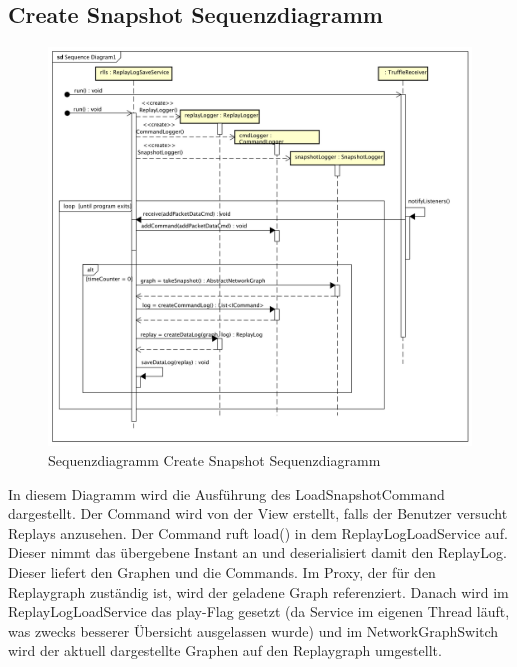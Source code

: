 \subsection{Create Snapshot Sequenzdiagramm}
\begin{figure}[H]
  \centering
  \includegraphics[width=\textwidth]{../diagramimages/sd_createsnapshot.png}
  \caption[Sequenzdiagramm Create Snapshot Sequenzdiagramm]{Sequenzdiagramm Create Snapshot Sequenzdiagramm}
\end{figure}

In diesem Diagramm wird die Ausführung des LoadSnapshotCommand dargestellt. Der Command wird von der View erstellt, falls der Benutzer versucht Replays anzusehen. Der Command ruft load() in dem ReplayLogLoadService auf. Dieser nimmt das übergebene Instant an und deserialisiert damit den ReplayLog. Dieser liefert den Graphen und die Commands. Im Proxy, der für den Replaygraph zuständig ist, wird der geladene Graph referenziert. Danach wird im ReplayLogLoadService das play-Flag gesetzt (da Service im eigenen Thread läuft, was zwecks besserer Übersicht ausgelassen wurde) und im NetworkGraphSwitch wird der aktuell dargestellte Graphen auf den Replaygraph umgestellt. 